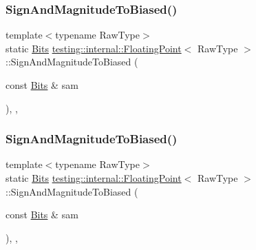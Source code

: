 \mbox{\label{classtesting_1_1internal_1_1_floating_point_a2cf0e39c6ebf026bc0353100d031ca85}} 
\subsubsection{\texorpdfstring{SignAndMagnitudeToBiased()}{SignAndMagnitudeToBiased()}\hspace{0.1cm}{\footnotesize\ttfamily [1/3]}}
{\footnotesize\ttfamily template$<$typename Raw\+Type$>$ \\
static \mbox{\hyperlink{classtesting_1_1internal_1_1_floating_point_abf228bf6cd48f12c8b44c85b4971a731}{Bits}} \mbox{\hyperlink{classtesting_1_1internal_1_1_floating_point}{testing\+::internal\+::\+Floating\+Point}}$<$ Raw\+Type $>$\+::Sign\+And\+Magnitude\+To\+Biased (\begin{DoxyParamCaption}\item[{const \mbox{\hyperlink{classtesting_1_1internal_1_1_floating_point_abf228bf6cd48f12c8b44c85b4971a731}{Bits}} \&}]{sam }\end{DoxyParamCaption})\hspace{0.3cm}{\ttfamily [inline]}, {\ttfamily [static]}, {\ttfamily [private]}}

\mbox{\label{classtesting_1_1internal_1_1_floating_point_a2cf0e39c6ebf026bc0353100d031ca85}} 
\subsubsection{\texorpdfstring{SignAndMagnitudeToBiased()}{SignAndMagnitudeToBiased()}\hspace{0.1cm}{\footnotesize\ttfamily [2/3]}}
{\footnotesize\ttfamily template$<$typename Raw\+Type$>$ \\
static \mbox{\hyperlink{classtesting_1_1internal_1_1_floating_point_abf228bf6cd48f12c8b44c85b4971a731}{Bits}} \mbox{\hyperlink{classtesting_1_1internal_1_1_floating_point}{testing\+::internal\+::\+Floating\+Point}}$<$ Raw\+Type $>$\+::Sign\+And\+Magnitude\+To\+Biased (\begin{DoxyParamCaption}\item[{const \mbox{\hyperlink{classtesting_1_1internal_1_1_floating_point_abf228bf6cd48f12c8b44c85b4971a731}{Bits}} \&}]{sam }\end{DoxyParamCaption})\hspace{0.3cm}{\ttfamily [inline]}, {\ttfamily [static]}, {\ttfamily [private]}}

